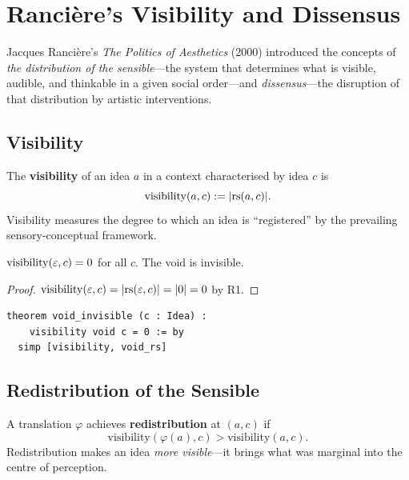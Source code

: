 \section{Rancière's Visibility and Dissensus}
\label{sec:adorno:ranciere}

Jacques Rancière's \emph{The Politics of Aesthetics} (2000) introduced the
concepts of \emph{the distribution of the sensible}---the system that
determines what is visible, audible, and thinkable in a given social
order---and \emph{dissensus}---the disruption of that distribution by
artistic interventions.

\subsection{Visibility}

\begin{definition}[Visibility]
\label{def:visibility}
The \textbf{visibility} of an idea $a$ in a context characterised by
idea $c$ is
\[
  \mathrm{visibility}(a, c) := |\mathrm{rs}(a, c)|.
\]
Visibility measures the degree to which an idea is ``registered'' by the
prevailing sensory-conceptual framework.
\end{definition}

\begin{theorem}
\label{thm:void-invisible}
$\mathrm{visibility}(\varepsilon, c) = 0$ for all $c$.  The void is invisible.
\end{theorem}

\begin{proof}
$\mathrm{visibility}(\varepsilon, c) = |\mathrm{rs}(\varepsilon, c)| = |0| = 0$ by R1.
\end{proof}

\begin{lstlisting}
theorem void_invisible (c : Idea) :
    visibility void c = 0 := by
  simp [visibility, void_rs]
\end{lstlisting}

\subsection{Redistribution of the Sensible}

\begin{definition}[Redistribution]
\label{def:redistribution}
A translation $\varphi$ achieves \textbf{redistribution} at $(a, c)$ if
\[
  \mathrm{visibility}(\varphi(a), c) > \mathrm{visibility}(a, c).
\]
Redistribution makes an idea \emph{more visible}---it brings what was
marginal into the centre of perception.
\end{definition}

